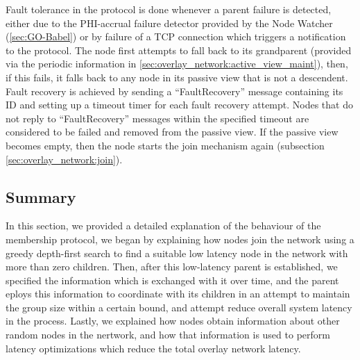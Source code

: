 Fault tolerance in the protocol is done whenever a parent failure is detected, either due to the PHI-accrual failure detector provided by the Node Watcher (\ref{sec:GO-Babel}) or by failure of a TCP connection which triggers a notification to the protocol. The node first attempts to fall back to its grandparent (provided via the periodic information in \ref{sec:overlay_network:active_view_maint}), then, if this fails, it falls back to any node in its passive view that is not a descendent. Fault recovery is achieved by sending a ``FaultRecovery'' message containing its ID and setting up a timeout timer for each fault recovery attempt. Nodes that do not reply to ``FaultRecovery'' messages within the specified timeout are considered to be failed and removed from the passive view. If the passive view becomes empty, then the node starts the join mechanism again (subsection \ref{sec:overlay_network:join}).

\subsection{Summary}

In this section, we provided a detailed explanation of the behaviour of the membership protocol, we began by explaining how nodes join the network using a greedy depth-first search to find a suitable low latency node in the network with more than zero children. Then, after this low-latency parent is established, we specified the information which is exchanged with it over time, and the parent eploys this information to coordinate with its children in an attempt to maintain the group size within a certain bound, and attempt reduce overall system latency in the process. Lastly, we explained how nodes obtain information about other random nodes in the nertwork, and how that information is used to perform latency optimizations which reduce the total overlay network latency.
